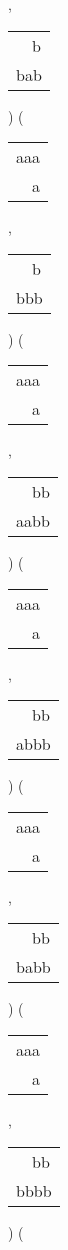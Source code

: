 \begin{description}
 , 
\begin{tabular}{|l|} \hline
\ \ b \\
bab \\
\hline
\end{tabular} 
) 
 ( 
\begin{tabular}{|l|} \hline
aaa \\
\ \ a \\
\hline
\end{tabular} 
 , 
\begin{tabular}{|l|} \hline
\ \ b \\
bbb \\
\hline
\end{tabular} 
) 
 ( 
\begin{tabular}{|l|} \hline
aaa \\
\ \ a \\
\hline
\end{tabular} 
 , 
\begin{tabular}{|l|} \hline
\ \ bb \\
aabb \\
\hline
\end{tabular} 
) 
 ( 
\begin{tabular}{|l|} \hline
aaa \\
\ \ a \\
\hline
\end{tabular} 
 , 
\begin{tabular}{|l|} \hline
\ \ bb \\
abbb \\
\hline
\end{tabular} 
) 
 ( 
\begin{tabular}{|l|} \hline
aaa \\
\ \ a \\
\hline
\end{tabular} 
 , 
\begin{tabular}{|l|} \hline
\ \ bb \\
babb \\
\hline
\end{tabular} 
) 
 ( 
\begin{tabular}{|l|} \hline
aaa \\
\ \ a \\
\hline
\end{tabular} 
 , 
\begin{tabular}{|l|} \hline
\ \ bb \\
bbbb \\
\hline
\end{tabular} 
) 
 ( 
\begin{tabular}{|l|} \hline

\end{tabular}
\end{description}
